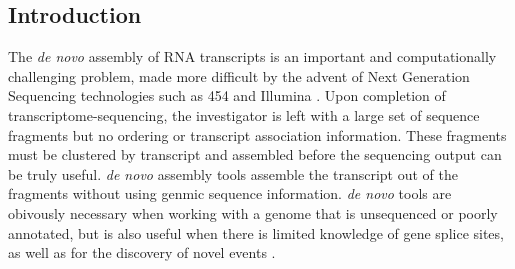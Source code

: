 \documentclass[10pt]{bmc_article}
\newenvironment{bmcformat}{\begin{raggedright}\baselineskip20pt\sloppy\setboolean{publ}{false}}{\end{raggedright}\baselineskip20pt\sloppy}
\begin{document}
\begin{bmcformat}
\begin{abstract}
\end{abstract}











  \section*{Introduction} {\color{blue} The {\it de novo} assembly of
    RNA transcripts is an important and computationally challenging
    problem, made more difficult by the advent of Next Generation
    Sequencing technologies such as 454 and Illumina
    \cite{Nagaraj07,Rao10}.  Upon completion of
    transcriptome-sequencing, the investigator is left with a large
    set of sequence fragments but no ordering or transcript
    association information.  These fragments must be clustered by
    transcript and assembled before the sequencing output can be truly
    useful.  {\it de novo} assembly tools assemble the
    transcript out of the fragments without using genmic sequence
    information.  {\it de novo} tools are obivously necessary when working with a genome that is
    unsequenced or poorly annotated, but is also useful when there is
    limited knowledge of gene splice sites, as well as for the discovery
    of novel events \cite{Birol09,Robertson10}.}


\end{bmcformat}
\end{document}
